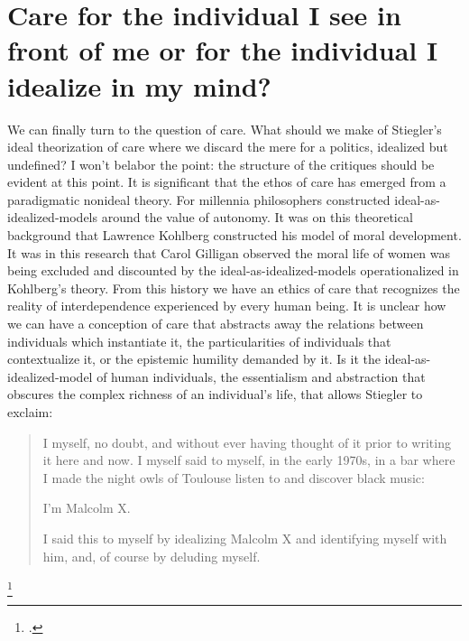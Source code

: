 \documentclass[letterpaper,notitlepage,12pt]{article}
\begin{document}
\section{Care for the individual I see in front of me or for the individual I
idealize in my mind?}

We can finally turn to the question of care.
What should we make of Stiegler's ideal theorization of care where we discard
the mere  for a politics, idealized but undefined? 
I won't belabor the point: the structure of the critiques should be evident 
at this point.
It is significant that the ethos of care has emerged from a paradigmatic nonideal
theory.
For millennia philosophers constructed ideal-as-idealized-models around the value
of autonomy.
It was on this theoretical background that Lawrence Kohlberg constructed his
model of moral development.
It was in this research that Carol Gilligan observed the moral life of women was
being excluded and discounted by the ideal-as-idealized-models operationalized
in Kohlberg's theory.
From this history we have an ethics of care that recognizes the reality of
interdependence experienced by every human being.
It is unclear how we can have a conception of care that abstracts away the
relations between individuals which instantiate it, the particularities of
individuals that contextualize it, or the epistemic humility demanded by it.
Is it the ideal-as-idealized-model of human individuals, the essentialism and
abstraction that obscures the complex richness of an individual's life, that
allows Stiegler to exclaim:
\blockquote{I myself, no doubt, and without ever having thought of it prior to
  writing it here and now. I myself said to myself, in the early 1970s, in a bar
  where I made the night owls of Toulouse listen to and discover black music:

  I'm Malcolm X.

  I said this to myself by idealizing Malcolm X and identifying myself with him,
and, of course by deluding myself.}\footcite[ch. 6.35]{stiegler_age_2019}




\nocite{searle_minds_1980}
\nocite{block_psychologism_1981}

\printbibliography
\end{document}
